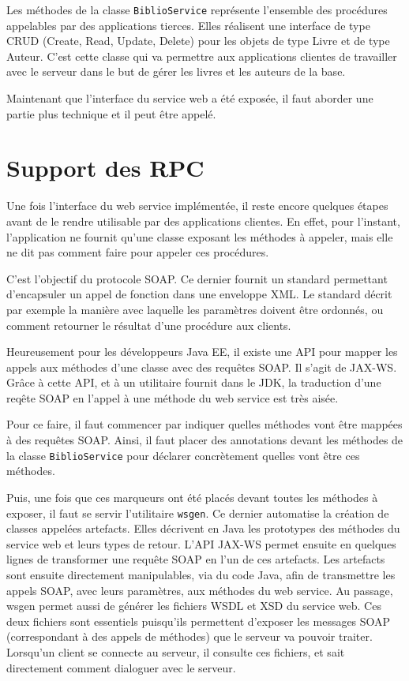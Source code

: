 
Les méthodes de la classe \verb|BiblioService| représente l’ensemble des procédures appelables par des applications tierces. Elles réalisent une interface de type CRUD (Create, Read, Update, Delete) pour les objets de type Livre et de type Auteur. C’est cette classe qui va permettre aux applications clientes de travailler avec le serveur dans le but de gérer les livres et les auteurs de la base.

Maintenant que l’interface du service web a été exposée, il faut aborder une partie plus technique et il peut être appelé.


\section{Support des RPC}
Une fois l’interface du web service implémentée, il reste encore quelques étapes avant de le rendre utilisable par des applications clientes. En effet, pour l’instant, l’application ne fournit qu’une classe exposant les méthodes à appeler, mais elle ne dit pas comment faire pour appeler ces procédures.

C’est l’objectif du protocole SOAP. Ce dernier fournit un standard permettant d’encapsuler un appel de fonction dans une enveloppe XML. Le standard décrit par exemple la manière avec laquelle les paramètres doivent être ordonnés, ou comment retourner le résultat d’une procédure aux clients.

Heureusement pour les développeurs Java EE, il existe une API pour mapper les appels aux méthodes d’une classe avec des requêtes SOAP. Il s’agit de JAX-WS. Grâce à cette API, et à un utilitaire fournit dans le JDK, la traduction d’une reqête SOAP en l’appel à une méthode du web service est très aisée.

Pour ce faire, il faut commencer par indiquer quelles méthodes vont être mappées à des requêtes SOAP. Ainsi, il faut placer des annotations devant les méthodes de la classe \verb|BiblioService| pour déclarer concrètement quelles vont être ces méthodes.

Puis, une fois que ces marqueurs ont été placés devant toutes les méthodes à exposer, il faut se servir l’utilitaire \verb|wsgen|. Ce dernier automatise la création de classes appelées artefacts. Elles décrivent en Java les prototypes des méthodes du service web et leurs types de retour. L’API JAX-WS permet ensuite en quelques lignes de transformer une requête SOAP en l’un de ces artefacts. Les artefacts sont ensuite directement manipulables, via du code Java, afin de transmettre les appels SOAP, avec leurs paramètres, aux méthodes du web service. Au passage, wsgen permet aussi de générer les fichiers WSDL et XSD du service web. Ces deux fichiers sont essentiels puisqu'ils permettent d'exposer les messages SOAP (correspondant à des appels de méthodes) que le serveur va pouvoir traiter. Lorsqu'un client se connecte au serveur, il consulte ces fichiers, et sait directement comment dialoguer avec le serveur.

